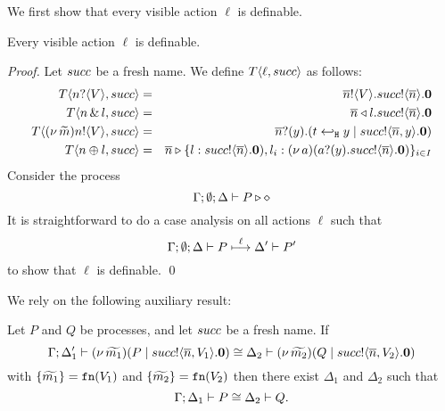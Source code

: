 We first show that every visible action $\ell$ is definable.

\begin{lemma}[Definability]
	\label{lem:definibility}
	Every visible action $\ell$ is definable.
\end{lemma}

\begin{proof}
	Let $succ$ be a fresh name. We define $T\langle \ell, succ \rangle$ as follows:
	\begin{eqnarray*}
		T\langle n ? \langle V \rangle, succ \rangle &=&
		\overline{n} ! \langle V \rangle . succ ! \langle \overline{n} \rangle . \mathbf{0}
		\\
		T\langle n \,\&\, l, succ \rangle &=&
		\overline{n} \triangleleft l . succ ! \langle \overline{n} \rangle . \mathbf{0}
		\\
		T\langle (\nu\, \widetilde{m}) n ! \langle V \rangle, succ \rangle &=&
		\overline{n} ? (y) . (t \hookleftarrow_{\mathtt{H}} y \;|\; succ ! \langle \overline{n}, y \rangle . \mathbf{0})
		\\
		T\langle n \oplus l, succ \rangle &=&
		\overline{n} \triangleright \{l: succ ! \langle \overline{n} \rangle . \mathbf{0}), l_i: (\nu\, a)(a ? (y) . succ ! \langle \overline{n} \rangle . \mathbf{0})\}_{i \in I}
	\end{eqnarray*}
Consider the process 
	\[
		\Gamma; \emptyset; \Delta \vdash P \triangleright \diamond
	\]
	\noi	It is straightforward to do a case analysis
			on all actions $\ell$ such that
			\[
				\Gamma; \emptyset; \Delta \vdash P \stackrel{\ell}{\longmapsto} \Delta' \vdash P'
			\]
			to show that $\ell$ is definable.
	\qed
\end{proof}

We rely on the following auxiliary result:




\begin{lemma}[Extrusion]\rm
	\label{lem:extrusion}
	Let $P$ and $Q$ be processes, and let $succ$ be a fresh name. 
	If 
	\[
		\Gamma; \Delta_1' \vdash (\nu\, \widetilde{m_1})(P \;|\; succ ! \langle \overline{n}, V_1 \rangle . \mathbf{0}) \cong \Delta_2 \vdash (\nu\, \widetilde{m_2})(Q \;|\; succ ! \langle \overline{n}, V_2 \rangle . \mathbf{0})
	\]
	with 
	 $\{\widetilde{m_1}\}= \mathtt{fn}(V_1)$ and $\{\widetilde{m_2}\} = \mathtt{fn}(V_2)$
	then there exist $\Delta_1$ and $\Delta_2$ such that
	\[
		\Gamma; \Delta_1 \vdash P \cong \Delta_2 \vdash Q.
	\]
\end{lemma}


